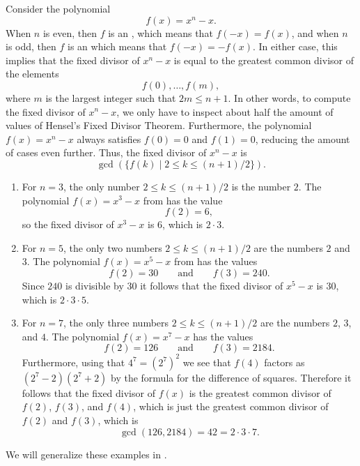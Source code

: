 \begin{example}
  Consider the polynomial
  \begin{equation*}
    f(x)=x^n-x.
  \end{equation*}
  When $n$ is even, then $f$ is an , which means that $f(-x)=f(x)$, and when $n$ is odd, then $f$ is an  which means that $f(-x)=-f(x)$. In either case, this implies that the fixed divisor of $x^n-x$ is equal to the greatest common divisor of the elements
  \begin{equation*}
    f(0),\ldots,f(m),
  \end{equation*}
  where $m$ is the largest integer such that $2m\leq n+1$.
  In other words, to compute the fixed divisor of $x^n-x$, we only have to inspect about half the amount of values of Hensel's Fixed Divisor Theorem. Furthermore, the polynomial $f(x)=x^n-x$ always satisfies $f(0)=0$ and $f(1)=0$, reducing the amount of cases even further. Thus, the fixed divisor of $x^n-x$ is
  \begin{equation*}
    \gcd(\{f(k)\mid 2\leq k \leq (n+1)/2\}).
  \end{equation*}
  \begin{enumerate}
  \item For $n=3$, the only number $2\leq k\leq (n+1)/2$ is the number $2$. The polynomial $f(x)=x^3-x$ from  has the value
    \begin{equation*}
      f(2)=6,
    \end{equation*}
    so the fixed divisor of $x^3-x$ is $6$, which is $2\cdot 3$.
  \item For $n=5$, the only two numbers $2\leq k \leq (n+1)/2$ are the numbers $2$ and $3$. The polynomial $f(x)=x^5-x$ from  has the values
    \begin{equation*}
      f(2)=30 \qquad\text{and}\qquad f(3)=240.
    \end{equation*}
    Since $240$ is divisible by $30$ it follows that the fixed divisor of $x^5-x$ is $30$, which is $2\cdot 3\cdot 5$.
  \item For $n=7$, the only three numbers $2\leq k \leq (n+1)/2$ are the numbers $2$, $3$, and $4$. The polynomial $f(x)=x^7-x$ has the values
    \begin{equation*}
      f(2)=126\qquad\text{and}\qquad f(3)=2184.
    \end{equation*}
    Furthermore, using that $4^7=(2^7)^2$ we see that $f(4)$ factors as $(2^7-2)(2^7+2)$ by the formula for the difference of squares. Therefore it follows that the fixed divisor of $f(x)$ is the greatest common divisor of $f(2)$, $f(3)$, and $f(4)$, which is just the greatest common divisor of $f(2)$ and $f(3)$, which is
    \begin{equation*}
      \gcd(126,2184)=42=2\cdot 3\cdot 7.
    \end{equation*}
  \end{enumerate}
  We will generalize these examples in .
\end{example}

